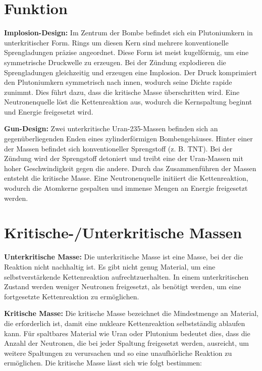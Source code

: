 \documentclass[a4paper,12pt]{article}
\begin{document}
\newpage

\clearpage
\section{Funktion}
\hypertarget{implosion_section}{}
\textbf{Implosion-Design:}
Im Zentrum der Bombe befindet sich ein Plutoniumkern in unterkritischer Form.
Rings um diesen Kern sind mehrere konventionelle Sprengladungen präzise angeordnet. Diese Form ist meist kugelförmig, um eine symmetrische Druckwelle zu erzeugen.
Bei der Zündung explodieren die Sprengladungen gleichzeitig und erzeugen eine Implosion.
Der Druck komprimiert den Plutoniumkern symmetrisch nach innen, wodurch seine Dichte rapide zunimmt. Dies führt dazu, dass die kritische Masse überschritten wird.
Eine Neutronenquelle löst die Kettenreaktion aus, wodurch die Kernspaltung beginnt und Energie freigesetzt wird.

\vspace*{2cm}

\hypertarget{gun_section}{}
\noindent\textbf{Gun-Design:}
Zwei unterkritische Uran-235-Massen befinden sich an gegenüberliegenden Enden eines zylinderförmigen Bombengehäuses.
Hinter einer der Massen befindet sich konventioneller Sprengstoff (z. B. TNT).
Bei der Zündung wird der Sprengstoff detoniert und treibt eine der Uran-Massen mit hoher Geschwindigkeit gegen die andere.
Durch das Zusammenführen der Massen entsteht die kritische Masse.
Eine Neutronenquelle initiiert die Kettenreaktion, wodurch die Atomkerne gespalten und immense Mengen an Energie freigesetzt werden.

\section{Kritische-/Unterkritische Massen}
\textbf{Unterkritische Masse:}
Die unterkritische Masse ist eine Masse, bei der die Reaktion nicht nachhaltig ist. Es gibt nicht genug Material, um eine selbstverstärkende Kettenreaktion aufrechtzuerhalten. In einem unterkritischen Zustand werden weniger Neutronen freigesetzt, als benötigt werden, um eine fortgesetzte Kettenreaktion zu ermöglichen.

\vspace*{2cm}

\noindent\textbf{Kritische Masse:}
Die kritische Masse bezeichnet die Mindestmenge an Material, die erforderlich ist, damit eine nukleare Kettenreaktion selbstständig ablaufen kann. Für spaltbares Material wie Uran oder Plutonium bedeutet dies, dass die Anzahl der Neutronen, die bei jeder Spaltung freigesetzt werden, ausreicht, um weitere Spaltungen zu verursachen und so eine unaufhörliche Reaktion zu ermöglichen.
Die kritische Masse lässt sich wie folgt bestimmen:
\end{document}
